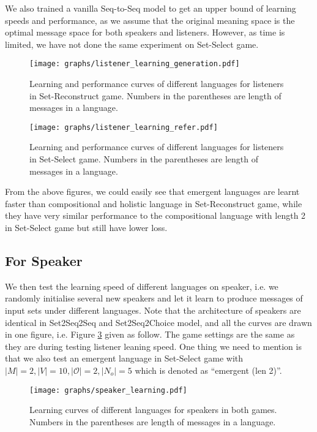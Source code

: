  We also trained a vanilla Seq-to-Seq model to get an upper bound of learning speeds and performance, as we assume that the original meaning space is the optimal message space for both speakers and listeners. However, as time is limited, we have not done the same experiment on Set-Select game.

\begin{figure}[!h]
    \centering
    \texttt{[image: graphs/listener\_learning\_generation.pdf]}
    \caption{Learning and performance curves of different languages for listeners in Set-Reconstruct game. Numbers in the parentheses are length of messages in a language.}
    \label{fig4.1:listener_learning_generation}
\end{figure}

\begin{figure}[!h]
    \centering
    \texttt{[image: graphs/listener\_learning\_refer.pdf]}
    \caption{Learning and performance curves of different languages for listeners in Set-Select game. Numbers in the parentheses are length of messages in a language.}
    \label{fig4.2:listener_learning_refer}
\end{figure}

From the above figures, we could easily see that emergent languages are learnt faster than compositional and holistic language in Set-Reconstruct game, while they have very similar performance to the compositional language with length 2 in Set-Select game but still have lower loss.

\subsection{For Speaker}
\label{ssec4.3.2:learning_speaker}

We then test the learning speed of different languages on speaker, i.e. we randomly initialise several new speakers and let it learn to produce messages of input sets under different languages. Note that the architecture of speakers are identical in Set2Seq2Seq and Set2Seq2Choice model, and all the curves are drawn in one figure, i.e. Figure \ref{fig4.3:speaker_learning} given as follow. The game settings are the same as they are during testing listener leaning speed. One thing we need to mention is that we also test an emergent language in Set-Select game with $|M|=2, |V|=10, |\mathcal{O}|=2, |N_o|=5$ which is denoted as ``emergent (len 2)''.

\begin{figure}[!h]
    \centering
    \texttt{[image: graphs/speaker\_learning.pdf]}
    \caption{Learning curves of different languages for speakers in both games. Numbers in the parentheses are length of messages in a language.}
    \label{fig4.3:speaker_learning}
\end{figure}

